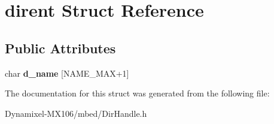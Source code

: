 \hypertarget{structdirent}{}\section{dirent Struct Reference}
\label{structdirent}
\subsection*{Public Attributes}
\begin{DoxyCompactItemize}
\item 
char {\bfseries d\+\_\+name} \mbox{[}N\+A\+M\+E\+\_\+\+M\+AX+1\mbox{]}\hypertarget{structdirent_a493ff210982a02728c1b177139bfdb47}{}\label{structdirent_a493ff210982a02728c1b177139bfdb47}

\end{DoxyCompactItemize}


The documentation for this struct was generated from the following file\+:\begin{DoxyCompactItemize}
\item 
Dynamixel-\/\+M\+X106/mbed/Dir\+Handle.\+h\end{DoxyCompactItemize}
